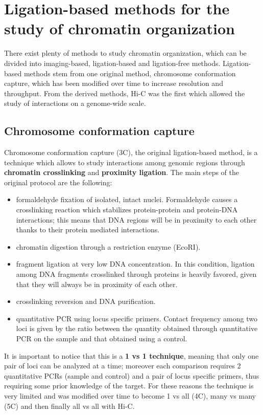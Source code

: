 \section{Ligation-based methods for the study of chromatin organization}

There exist plenty of methods to study chromatin organization, which can be divided into imaging-based, ligation-based and ligation-free methods. Ligation-based methods stem from one original method, chromosome conformation capture\cite{3coriginal2002}, which has been modified over time to increase resolution and throughput. From the derived methods, Hi-C was the first which allowed the study of interactions on a genome-wide scale.

\subsection{Chromosome conformation capture}
Chromosome conformation capture (3C), the original ligation-based method, is a technique which allows to study interactions among genomic regions through \textbf{chromatin crosslinking} and \textbf{proximity ligation}\cite{3coriginal2002}. The main steps of the original protocol are the following:
\begin{itemize}\tightlist
  \item formaldehyde fixation of isolated, intact nuclei. Formaldehyde causes a crosslinking reaction which stabilizes protein-protein and protein-DNA interactions; this means that DNA regions will be in proximity to each other thanks to their protein mediated interactions. 
  \item chromatin digestion through a restriction enzyme (EcoRI).
  \item fragment ligation at very low DNA concentration. In this condition, ligation among DNA fragments crosslinked through proteins is heavily favored, given that they will always be in proximity of each other.
  \item crosslinking reversion and DNA purification.
  \item quantitative PCR using locus specific primers. Contact frequency among two loci is given by the ratio between the quantity obtained through quantitative PCR on the sample and that obtained using a control.
\end{itemize}
It is important to notice that this is a \textbf{1 vs 1 technique}, meaning that only one pair of loci can be analyzed at a time; moreover each comparison requires 2 quantitative PCRs (sample and control) and a pair of locus specific primers, thus requiring some prior knowledge of the target. For these reasons the technique is very limited and was modified over time to become 1 vs all (4C\cite{4cprotocol2006}), many vs many (5C\cite{5cprotocol2006}) and then finally all vs all with Hi-C.


